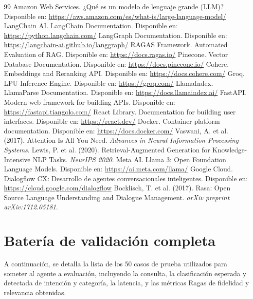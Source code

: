 \documentclass[12pt,a4paper,oneside]{report}
\begin{document}
\begin{thebibliography}{99}
     Amazon Web Services. ¿Qué es un modelo de lenguaje grande (LLM)? Disponible en: \url{https://aws.amazon.com/es/what-is/large-language-model/}
     LangChain AI. LangChain Documentation. Disponible en: \url{https://python.langchain.com/}
     LangGraph Documentation. Disponible en: \url{https://langchain-ai.github.io/langgraph/}
     RAGAS Framework. Automated Evaluation of RAG. Disponible en: \url{https://docs.ragas.io/}
     Pinecone. Vector Database Documentation. Disponible en: \url{https://docs.pinecone.io/}
     Cohere. Embeddings and Reranking API. Disponible en: \url{https://docs.cohere.com/}
     Groq. LPU Inference Engine. Disponible en: \url{https://groq.com/}
     LlamaIndex. LlamaParse Documentation. Disponible en: \url{https://docs.llamaindex.ai/}
     FastAPI. Modern web framework for building APIs. Disponible en: \url{https://fastapi.tiangolo.com/}
     React Library. Documentation for building user interfaces. Disponible en: \url{https://react.dev/}
     Docker. Container platform documentation. Disponible en: \url{https://docs.docker.com/}
     Vaswani, A. et al. (2017). Attention Is All You Need. \textit{Advances in Neural Information Processing Systems}.
     Lewis, P. et al. (2020). Retrieval-Augmented Generation for Knowledge-Intensive NLP Tasks. \textit{NeurIPS 2020}.
     Meta AI. Llama 3: Open Foundation Language Models. Disponible en: \url{https://ai.meta.com/llama/}
     Google Cloud. Dialogflow CX: Desarrollo de agentes conversacionales inteligentes. Disponible en: \url{https://cloud.google.com/dialogflow}
     Bocklisch, T. et al. (2017). Rasa: Open Source Language Understanding and Dialogue Management. \textit{arXiv preprint arXiv:1712.05181}.
\end{thebibliography}

\appendix

\chapter{Batería de validación completa}
A continuación, se detalla la lista de los 50 casos de prueba utilizados para someter al agente a evaluación, incluyendo la consulta, la clasificación esperada y detectada de intención y categoría, la latencia, y las métricas Ragas de fidelidad y relevancia obtenidas.
\end{document}
